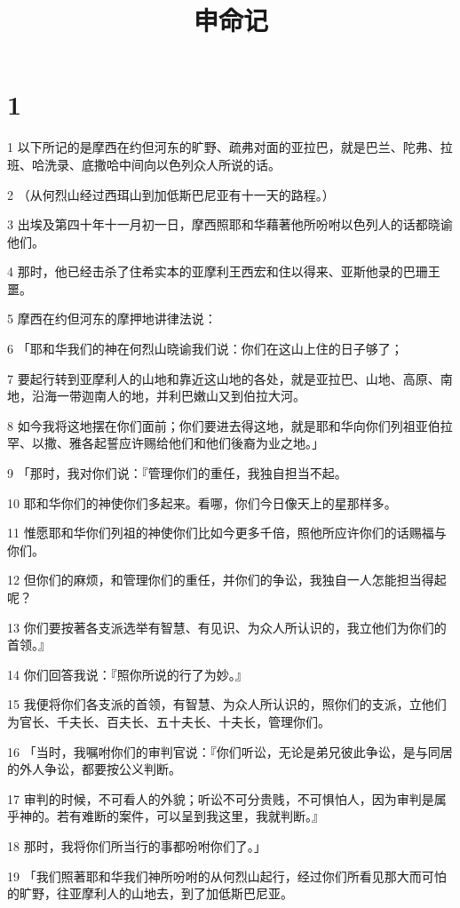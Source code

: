 

\title{申命记}


\chapter{1}

\par 1 以下所记的是摩西在约但河东的旷野、疏弗对面的亚拉巴，就是巴兰、陀弗、拉班、哈洗录、底撒哈中间向以色列众人所说的话。
\par 2 （从何烈山经过西珥山到加低斯巴尼亚有十一天的路程。）
\par 3 出埃及第四十年十一月初一日，摩西照耶和华藉著他所吩咐以色列人的话都晓谕他们。
\par 4 那时，他已经击杀了住希实本的亚摩利王西宏和住以得来、亚斯他录的巴珊王噩。
\par 5 摩西在约但河东的摩押地讲律法说：
\par 6 「耶和华我们的神在何烈山晓谕我们说：你们在这山上住的日子够了；
\par 7 要起行转到亚摩利人的山地和靠近这山地的各处，就是亚拉巴、山地、高原、南地，沿海一带迦南人的地，并利巴嫩山又到伯拉大河。
\par 8 如今我将这地摆在你们面前；你们要进去得这地，就是耶和华向你们列祖亚伯拉罕、以撒、雅各起誓应许赐给他们和他们後裔为业之地。」
\par 9 「那时，我对你们说：『管理你们的重任，我独自担当不起。
\par 10 耶和华你们的神使你们多起来。看哪，你们今日像天上的星那样多。
\par 11 惟愿耶和华你们列祖的神使你们比如今更多千倍，照他所应许你们的话赐福与你们。
\par 12 但你们的麻烦，和管理你们的重任，并你们的争讼，我独自一人怎能担当得起呢？
\par 13 你们要按著各支派选举有智慧、有见识、为众人所认识的，我立他们为你们的首领。』
\par 14 你们回答我说：『照你所说的行了为妙。』
\par 15 我便将你们各支派的首领，有智慧、为众人所认识的，照你们的支派，立他们为官长、千夫长、百夫长、五十夫长、十夫长，管理你们。
\par 16 「当时，我嘱咐你们的审判官说：『你们听讼，无论是弟兄彼此争讼，是与同居的外人争讼，都要按公义判断。
\par 17 审判的时候，不可看人的外貌；听讼不可分贵贱，不可惧怕人，因为审判是属乎神的。若有难断的案件，可以呈到我这里，我就判断。』
\par 18 那时，我将你们所当行的事都吩咐你们了。」
\par 19 「我们照著耶和华我们神所吩咐的从何烈山起行，经过你们所看见那大而可怕的旷野，往亚摩利人的山地去，到了加低斯巴尼亚。
